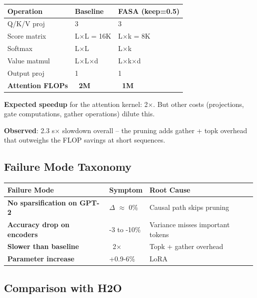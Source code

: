 \begin{table}[H]
\centering
\small
\begin{tabular}{lll}
\toprule
\textbf{Operation} & \textbf{Baseline} & \textbf{FASA (keep=0.5)} \\
\midrule
Q/K/V proj & 3 & 3 \\
Score matrix & L$\times$L = 16K & L$\times$k = 8K \\
Softmax & L$\times$L & L$\times$k \\
Value matmul & L$\times$L$\times$d & L$\times$k$\times$d \\
Output proj & 1 & 1 \\
\textbf{Attention FLOPs} & \textbf{~2M} & \textbf{~1M} \\
\bottomrule
\end{tabular}
\end{table}

\textbf{Expected speedup} for the attention kernel: 2$\times$. But other costs 
(projections, gate computations, gather operations) dilute this.

\textbf{Observed}: 2.3 s$\times$ slowdown overall -- the pruning adds gather + 
topk overhead that outweighs the FLOP savings at short sequences.

\subsection{Failure Mode Taxonomy}

\begin{table}[H]
\centering
\small
\begin{tabular}{lll}
\toprule
\textbf{Failure Mode} & \textbf{Symptom} & \textbf{Root Cause} \\
\midrule
\textbf{No sparsification on GPT-2} & $\Delta$ $\approx$ 0\% & Causal path skips pruning \\
\textbf{Accuracy drop on encoders} & -3 to -10\% & Variance misses important tokens \\
\textbf{Slower than baseline} & ~2$\times$ & Topk + gather overhead \\
\textbf{Parameter increase} & +0.9-6\% & LoRA \\
\bottomrule
\end{tabular}
\end{table}

\subsection{Comparison with H2O}

